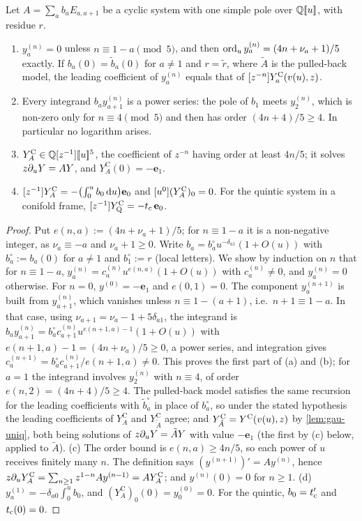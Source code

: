 \begin{lem}
\label{lem:gau-vanq}
Let $A=\sum_ab_aE_{a,a+1}$ be a cyclic system with one simple pole over $\mathbb{Q}[\![ u ]\!]$, with residue $r$.
\begin{enumerate}
\item[(a)] $y^{(n)}_a=0$ unless $n\equiv1-a\pmod5$, and then $\operatorname{ord}_uy^{(n)}_a=(4n+\nu_a+1)/5$ exactly. If $b_a(0)=\tilde b_a(0)$ for $a\neq1$ and $r=\tilde r$, where $\tilde A$ is the pulled-back model, the leading coefficient of $y^{(n)}_a$ equals that of $[z^{-n}]Y^{\mathrm{C}}_a(v(u),z)$.
\item[(b)] Every integrand $b_ay^{(n)}_{a+1}$ is a power series: the pole of $b_1$ meets $y^{(n)}_2$, which is non-zero only for $n\equiv4\pmod5$ and then has order $(4n+4)/5\geq4$. In particular no logarithm arises.
\item[(c)] $Y^{\mathrm C}_A\in\mathbb{Q}[z^{-1}][\![ u ]\!]^5$, the coefficient of $z^{-n}$ having order at least $4n/5$; it solves $z\partial_uY=AY$, and $Y^{\mathrm C}_A(0)=-\mathbf e_1$.
\item[(d)] $[z^{-1}]Y^{\mathrm C}_A=-\bigl(\int_0^ub_0\,\mathrm{d} u\bigr)\mathbf e_0$ and $[u^0](Y^{\mathrm C}_A)_0=0$. For the quintic system in a conifold frame, $[z^{-1}]Y^{\mathrm{C}}_{\mathrm{Q}}=-t_{\mathrm{c}}\,\mathbf e_0$.
\end{enumerate}
\end{lem}

\begin{proof}
Put $e(n,a):=(4n+\nu_a+1)/5$; for $n\equiv1-a$ it is a non-negative integer, as $\nu_a\equiv-a$ and $\nu_a+1\geq0$. Write $b_a=b^\circ_au^{-\delta_{a1}}(1+O(u))$ with $b^\circ_a:=b_a(0)$ for $a\neq1$ and $b^\circ_1:=r$ (local letters). We show by induction on $n$ that for $n\equiv1-a$, $y^{(n)}_a=c^{(n)}_au^{e(n,a)}(1+O(u))$ with $c^{(n)}_a\neq0$, and $y^{(n)}_a=0$ otherwise. For $n=0$, $y^{(0)}=-\mathbf e_1$ and $e(0,1)=0$. The component $y^{(n+1)}_a$ is built from $y^{(n)}_{a+1}$, which vanishes unless $n\equiv1-(a+1)$, i.e.\ $n+1\equiv1-a$. In that case, using $\nu_{a+1}=\nu_a-1+5\delta_{a1}$, the integrand is $b_ay^{(n)}_{a+1}=b^\circ_ac^{(n)}_{a+1}u^{e(n+1,a)-1}(1+O(u))$ with $e(n+1,a)-1=(4n+\nu_a)/5\geq0$, a power series, and integration gives $c^{(n+1)}_a=b^\circ_ac^{(n)}_{a+1}/e(n+1,a)\neq0$. This proves the first part of (a) and (b); for $a=1$ the integrand involves $y^{(n)}_2$ with $n\equiv4$, of order $e(n,2)=(4n+4)/5\geq4$. The pulled-back model satisfies the same recursion for the leading coefficients with $\tilde b^\circ_a$ in place of $b^\circ_a$, so under the stated hypothesis the leading coefficients of $Y^{\mathrm C}_A$ and $Y^{\mathrm C}_{\tilde A}$ agree; and $Y^{\mathrm C}_{\tilde A}=Y^{\mathrm{C}}(v(u),z)$ by \cref{lem:gau-uniq}, both being solutions of $z\partial_uY=\tilde AY$ with value $-\mathbf e_1$ (the first by (c) below, applied to $\tilde A$). (c) The order bound is $e(n,a)\geq4n/5$, so each power of $u$ receives finitely many $n$. The definition says $(y^{(n+1)})'=Ay^{(n)}$, hence $z\partial_uY^{\mathrm C}_A=\sum_{n\geq1}z^{1-n}Ay^{(n-1)}=AY^{\mathrm C}_A$; and $y^{(n)}(0)=0$ for $n\geq1$. (d) $y^{(1)}_a=-\delta_{a0}\int_0^ub_0$, and $(Y^{\mathrm C}_A)_0(0)=y^{(0)}_0=0$. For the quintic, $b_0=t_{\mathrm{c}}'$ and $t_{\mathrm{c}}(0)=0$.
\end{proof}

